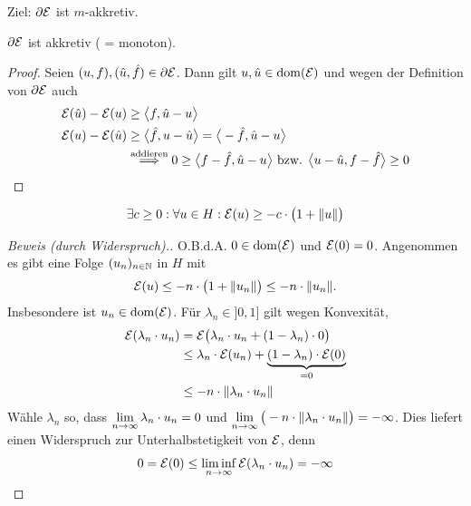 Ziel: $\partial\mathcal{E}$ ist $m$-akkretiv.

\begin{lemma}
	$\partial\mathcal{E}$ ist akkretiv ( = monoton).
\end{lemma}

\begin{proof}
	Seien $(u,f),(\hat{u},\hat{f})\in\partial\mathcal{E}$. 
	Dann gilt $u,\hat{u}\in\operatorname{dom}(\mathcal{E})$ und wegen der Definition von $\partial\mathcal{E}$ auch
	\begin{align*}
		\mathcal{E}(\hat{u})-\mathcal{E}(u)&\geq\big\langle f,\hat{u}-u\big\rangle\\
		\mathcal{E}(u)-\mathcal{E}(\hat{u})&\geq\big\langle \hat{f},u-\hat{u}\big\rangle=\big\langle-\hat{f},\hat{u}-u\big\rangle\\
		&\stackrel{\text{addieren}}{\implies}
		0\geq\big\langle f-\hat{f},\hat{u}-u\big\rangle
		\text{ bzw. }
		\big\langle u-\hat{u},f-\hat{f}\big\rangle\geq0
	\end{align*}
\end{proof}

\begin{lemma}\label{lemma1.3.2}
	\begin{align*}
		\exists c\geq0:\forall u\in H:\mathcal{E}(u)\geq -c\cdot\big(1+\Vert u\Vert\big)
	\end{align*}
\end{lemma}

\begin{proof}[Beweis (durch Widerspruch).]\enter
	O.B.d.A. $0\in\operatorname{dom}(\mathcal{E})$ und $\mathcal{E}(0)=0$. 
	Angenommen es gibt eine Folge $(u_n)_{n\in\mathbb{N}}$ in $H$ mit
	\begin{align*}
		\mathcal{E}(u)\leq -n\cdot\big(1+\Vert u_n\Vert\big)\leq -n\cdot\Vert u_n\Vert.
	\end{align*}
	Insbesondere ist $u_n\in\operatorname{dom}(\mathcal{E})$. 
	Für $\lambda_n\in]0,1]$ gilt wegen Konvexität,
	\begin{align*}
		\mathcal{E}(\lambda_n\cdot u_n)
		&=\mathcal{E}\big(\lambda_n\cdot u_n+(1-\lambda_n)\cdot 0\big)\\
		&\leq\lambda_n\cdot\mathcal{E}(u_n)+\underbrace{(1-\lambda_n)\cdot\mathcal{E}(0)}_{=0}\\
		&\leq- n\cdot\Vert\lambda_n\cdot u_n\Vert
	\end{align*}
	Wähle $\lambda_n$ so, dass $\lim\limits_{n\to\infty}\lambda_n\cdot u_n=0$ und $\lim\limits_{n\to\infty}\big(-n\cdot\Vert\lambda_n\cdot u_n\Vert\big)=-\infty$. 
	Dies liefert einen Widerspruch zur Unterhalbstetigkeit von $\mathcal{E}$, denn
	\begin{align*}
		0=\mathcal{E}(0)\leq\liminf\limits_{n\to\infty}\mathcal{E}(\lambda_n\cdot u_n)=-\infty
	\end{align*}
\end{proof}

